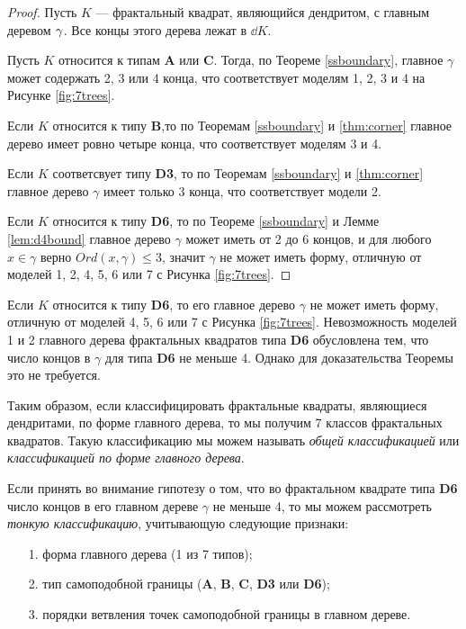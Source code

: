 

\begin{proof}
Пусть $K$ --- фрактальный квадрат, являющийся дендритом, с главным деревом $\gamma$. 
Все концы этого дерева лежат в $\dd K$.

Пусть $K$ относится к типам {\bf A} или {\bf C}. 
Тогда, по Теореме \ref{ssboundary}, главное $\gamma$ может содержать 2, 3 или 4 конца, что соответствует моделям 1, 2, 3 и 4 на Рисунке \ref{fig:7trees}.


Если $K$ относится к типу {\bf B},то по Теоремам \ref{ssboundary} и \ref{thm:corner} главное дерево имеет ровно четыре конца, что соответствует моделям 3 и 4.

Если $K$ соответсвует типу {\bf D3}, то по Теоремам \ref{ssboundary} и \ref{thm:corner} главное дерево $\gamma$ имеет только 3 конца, что соответствует модели 2.

Если $K$ относится к типу {\bf D6}, то по Теореме \ref{ssboundary} и Лемме \ref{lem:d4bound} главное дерево $\gamma$ может иметь от 2 до 6 концов, и для любого  $x\in \gamma $ верно $ Ord(x,\gamma)\leq3$, значит $\gamma$ не может иметь форму, отличную от моделей 1, 2, 4, 5, 6 или 7 с Рисунка \ref{fig:7trees}.
\end{proof}

\newpage
\begin{remark}
Если $K$ относится к типу {\bf D6}, то его главное дерево $\gamma$ не может иметь форму, отличную от моделей 4, 5, 6 или 7 с Рисунка \ref{fig:7trees}.
Невозможность моделей 1 и 2 главного дерева фрактальных квадратов типа {\bf D6} обусловлена тем, что число концов в $\gamma$ для типа {\bf D6} не меньше 4.
Однако для доказательства Теоремы \label{thm:7trees} это не требуется.
\end{remark}

Таким образом, если классифицировать фрактальные квадраты, являющиеся дендритами, по форме главного дерева, то мы получим 7 классов фрактальных квадратов.
Такую классификацию мы можем называть {\em общей классификацией} или {\em классификацией по форме главного дерева}.

Если принять во внимание гипотезу о том, что во фрактальном квадрате типа {\bf D6} число концов в его главном дереве $\gamma$ не меньше 4, то мы можем рассмотреть {\em тонкую классификацию}, учитывающую следующие признаки:
\begin{itemize}[nolistsep]
	\item[1.] форма главного дерева (1 из 7 типов);
	\item[2.] тип самоподобной границы ({\bf A}, {\bf B}, {\bf C}, {\bf D3} или {\bf D6});
	\item[3.] порядки ветвления точек самоподобной границы в главном дереве.
\end{itemize}

